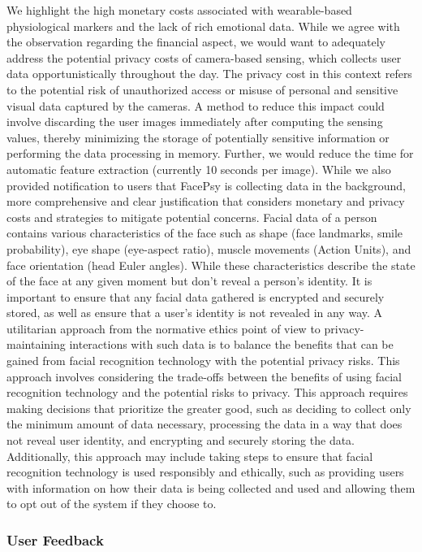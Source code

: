 We highlight the high monetary costs associated with wearable-based physiological markers and the lack of rich emotional data. While we agree with the observation regarding the financial aspect, we would want to adequately address the potential privacy costs of camera-based sensing, which collects user data opportunistically throughout the day. The privacy cost in this context refers to the potential risk of unauthorized access or misuse of personal and sensitive visual data captured by the cameras. A method to reduce this impact could involve discarding the user images immediately after computing the sensing values, thereby minimizing the storage of potentially sensitive information or performing the data processing in memory. Further, we would reduce the time for automatic feature extraction (currently 10 seconds per image). While we also provided notification to users that FacePsy is collecting data in the background, more comprehensive and clear justification that considers monetary and privacy costs and strategies to mitigate potential concerns. Facial data of a person contains various characteristics of the face such as shape (face landmarks, smile probability), eye shape (eye-aspect ratio), muscle movements (Action Units), and face orientation (head Euler angles). While these characteristics describe the state of the face at any given moment but don't reveal a person's identity.  It is important to ensure that any facial data gathered is encrypted and securely stored, as well as ensure that a user's identity is not revealed in any way. A utilitarian approach from the normative ethics point of view \cite{ruotsalainen2020health} to privacy-maintaining interactions with such data is to balance the benefits that can be gained from facial recognition technology with the potential privacy risks. This approach involves considering the trade-offs between the benefits of using facial recognition technology and the potential risks to privacy. This approach requires making decisions that prioritize the greater good, such as deciding to collect only the minimum amount of data necessary, processing the data in a way that does not reveal user identity, and encrypting and securely storing the data. Additionally, this approach may include taking steps to ensure that facial recognition technology is used responsibly and ethically, such as providing users with information on how their data is being collected and used and allowing them to opt out of the system if they choose to.

\subsubsection{User Feedback}

